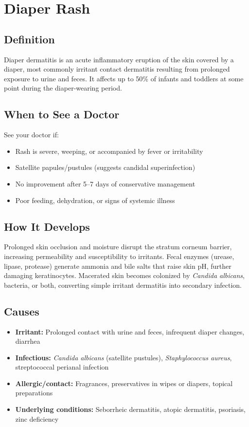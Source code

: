 \chapter{Diaper Rash}

\section*{Definition}
Diaper dermatitis is an acute inflammatory eruption of the skin covered by a diaper, most commonly irritant contact dermatitis resulting from prolonged exposure to urine and feces. It affects up to 50\% of infants and toddlers at some point during the diaper-wearing period.

\section*{When to See a Doctor}
See your doctor if:
\begin{itemize}
  \item Rash is severe, weeping, or accompanied by fever or irritability
  \item Satellite papules/pustules (suggests candidal superinfection)
  \item No improvement after 5--7 days of conservative management
  \item Poor feeding, dehydration, or signs of systemic illness
\end{itemize}

\section*{How It Develops}
Prolonged skin occlusion and moisture disrupt the stratum corneum barrier, increasing permeability and susceptibility to irritants. Fecal enzymes (urease, lipase, protease) generate ammonia and bile salts that raise skin pH, further damaging keratinocytes. Macerated skin becomes colonized by \textit{Candida albicans}, bacteria, or both, converting simple irritant dermatitis into secondary infection.

\section*{Causes}
\begin{itemize}
  \item \textbf{Irritant:} Prolonged contact with urine and feces, infrequent diaper changes, diarrhea
  \item \textbf{Infectious:} \textit{Candida albicans} (satellite pustules), \textit{Staphylococcus aureus}, streptococcal perianal infection
  \item \textbf{Allergic/contact:} Fragrances, preservatives in wipes or diapers, topical preparations
  \item \textbf{Underlying conditions:} Seborrheic dermatitis, atopic dermatitis, psoriasis, zinc deficiency
\end{itemize}

